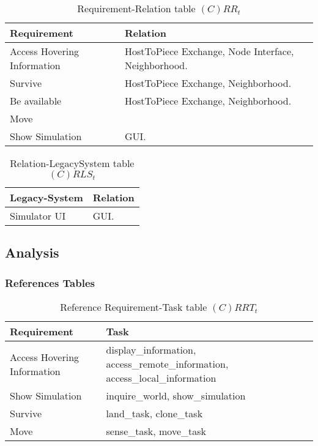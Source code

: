 \begin{table}[H]
	\centering
	\begin{tabular}{|p{4cm}|p{8cm}|}
			\hline
			\textbf{Requirement} & \textbf{Relation} \\
			\hline
			Access Hovering Information & HostToPiece Exchange, Node Interface, Neighborhood.  \\
			\hline
			Survive & HostToPiece Exchange, Neighborhood. \\
			\hline
			Be available & HostToPiece Exchange, Neighborhood. \\
			\hline
			Move & \\
			\hline
			Show Simulation & GUI. \\
			\hline
		\end{tabular}
	\caption{Requirement-Relation table $(C)RR_t$}
	\label{tab:crrt}
\end{table}

\begin{table}[H]
	\centering
	\begin{tabular}{|p{4cm}|p{8cm}|}
			\hline
			\textbf{Legacy-System} & \textbf{Relation} \\
			\hline
			Simulator UI & GUI. \\
			\hline
		\end{tabular}
	\caption{Relation-LegacySystem table $(C)RLS_t$}
	\label{tab:crlst}
\end{table}


\subsection{Analysis}

\subsubsection{References Tables}

\begin{table}[H]
	\centering
	\begin{tabular}{|p{4cm}|p{8cm}|}
			\hline
			\textbf{Requirement} & \textbf{Task} \\
			\hline
      Access Hovering Information & display\_information,
                access\_remote\_information, access\_local\_information \\
			\hline
			Show Simulation & inquire\_world, show\_simulation \\
			\hline
			Survive & land\_task, clone\_task \\
			\hline
			Move & sense\_task, move\_task \\
			\hline
		\end{tabular}
	\caption{Reference Requirement-Task table $(C)RRT_t$}
	\label{tab:crrtt}
\end{table}

